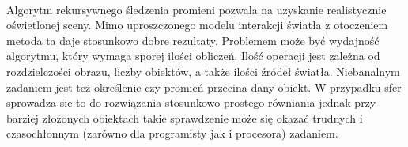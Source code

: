 \documentclass[wide,a4paper,titlepage,12pt] {article}
\begin{document}
  \paragraph{}
  Algorytm rekursywnego śledzenia promieni pozwala na uzyskanie realistycznie oświetlonej sceny. Mimo uproszczonego modelu interakcji światła z otoczeniem metoda ta daje stosunkowo dobre rezultaty. Problemem może być wydajność algorytmu, który wymaga sporej ilości obliczeń. Ilość operacji jest zależna od rozdzielczości obrazu, liczby obiektów, a także ilości źródeł światła. Niebanalnym zadaniem jest też określenie czy promień przecina dany obiekt. W przypadku sfer sprowadza sie to do rozwiązania stosunkowo prostego równiania jednak przy barziej złożonych obiektach takie sprawdzenie może się okazać trudnych i czasochłonnym (zarówno dla programisty jak i procesora) zadaniem.
\end{document}
